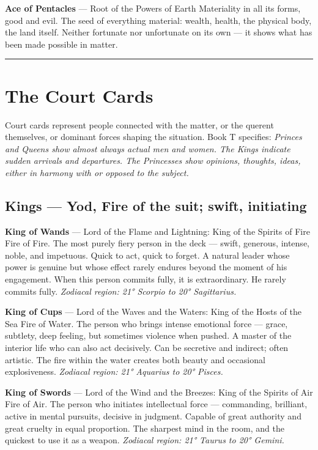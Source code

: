 \textbf{Ace of Pentacles} --- Root of the Powers of Earth Materiality in all its forms, good and evil. The seed of everything material: wealth, health, the physical body, the land itself. Neither fortunate nor unfortunate on its own --- it shows what has been made possible in matter.

\begin{center}\rule{0.5\linewidth}{0.5pt}\end{center}

\section{The Court Cards}\label{the-court-cards}

Court cards represent people connected with the matter, or the querent themselves, or dominant forces shaping the situation. Book T specifies: \emph{Princes and Queens show almost always actual men and women. The Kings indicate sudden arrivals and departures. The Princesses show opinions, thoughts, ideas, either in harmony with or opposed to the subject.}

\subsection{Kings --- Yod, Fire of the suit; swift, initiating}\label{kings--yod-fire-of-the-suit-swift-initiating}

\textbf{King of Wands} --- Lord of the Flame and Lightning: King of the Spirits of Fire Fire of Fire. The most purely fiery person in the deck --- swift, generous, intense, noble, and impetuous. Quick to act, quick to forget. A natural leader whose power is genuine but whose effect rarely endures beyond the moment of his engagement. When this person commits fully, it is extraordinary. He rarely commits fully. \emph{Zodiacal region: 21° Scorpio to 20° Sagittarius.}

\textbf{King of Cups} --- Lord of the Waves and the Waters: King of the Hosts of the Sea Fire of Water. The person who brings intense emotional force --- grace, subtlety, deep feeling, but sometimes violence when pushed. A master of the interior life who can also act decisively. Can be secretive and indirect; often artistic. The fire within the water creates both beauty and occasional explosiveness. \emph{Zodiacal region: 21° Aquarius to 20° Pisces.}

\textbf{King of Swords} --- Lord of the Wind and the Breezes: King of the Spirits of Air Fire of Air. The person who initiates intellectual force --- commanding, brilliant, active in mental pursuits, decisive in judgment. Capable of great authority and great cruelty in equal proportion. The sharpest mind in the room, and the quickest to use it as a weapon. \emph{Zodiacal region: 21° Taurus to 20° Gemini.}

